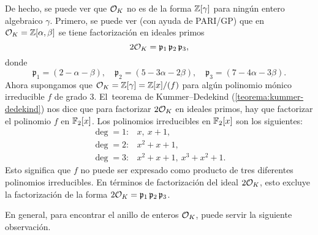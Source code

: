 \begin{ejemplo}[Dedekind]
  De hecho, se puede ver que $\mathcal{O}_K$ no es de la forma $\mathbb{Z} [\gamma]$ para ningún
  entero algebraico $\gamma$. Primero, se puede ver (con ayuda de PARI/GP)
  que en $\mathcal{O}_K = \mathbb{Z} [\alpha,\beta]$ se tiene factorización en ideales primos
  $$2\mathcal{O}_K = \mathfrak{p}_1 \, \mathfrak{p}_2 \, \mathfrak{p}_3,$$
  donde
  \[ \mathfrak{p}_1 = (2 - \alpha - \beta), \quad
     \mathfrak{p}_2 = (5 - 3\alpha - 2\beta), \quad
     \mathfrak{p}_3 = (7 - 4\alpha - 3\beta). \]
  Ahora supongamos que $\mathcal{O}_K = \mathbb{Z} [\gamma] = \mathbb{Z} [x] / (f)$ para algún
  polinomio mónico irreducible $f$ de grado $3$. El~teorema de Kummer--Dedekind
  (\ref{teorema:kummer-dedekind}) nos dice que para factorizar $2\mathcal{O}_K$ en
  ideales primos, hay que factorizar el polinomio $f$ en $\mathbb{F}_2 [x]$. Los
  polinomios irreducibles en $\mathbb{F}_2 [x]$ son los siguientes:
  \begin{align*}
    \deg = 1\colon & x, ~ x+1, \\
    \deg = 2\colon & x^2 + x + 1, \\
    \deg = 3\colon & x^2 + x + 1, ~ x^3 + x^2 + 1.
  \end{align*}
  Esto significa que $f$ no puede ser expresado como producto de tres diferentes
  polinomios irreducibles. En términos de factorización del ideal $2\mathcal{O}_K$, esto
  excluye la factorización de la forma
  $2\mathcal{O}_K = \mathfrak{p}_1 \, \mathfrak{p}_2 \, \mathfrak{p}_3$.
\end{ejemplo}


En general, para encontrar el anillo de enteros $\mathcal{O}_K$, puede servir
la siguiente observación.

